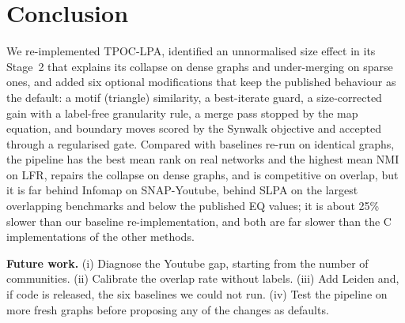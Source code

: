 \documentclass[conference]{IEEEtran}
\begin{document}
\section{Conclusion}
We re-implemented TPOC-LPA, identified an unnormalised size effect in its Stage~2 that explains its collapse on dense graphs and under-merging on sparse ones, and added six optional modifications that keep the published behaviour as the default: a motif (triangle) similarity, a best-iterate guard, a size-corrected gain with a label-free granularity rule, a merge pass stopped by the map equation, and boundary moves scored by the Synwalk objective and accepted through a regularised gate. Compared with baselines re-run on identical graphs, the pipeline has the best mean rank on real networks and the highest mean NMI on LFR, repairs the collapse on dense graphs, and is competitive on overlap, but it is far behind Infomap on SNAP-Youtube, behind SLPA on the largest overlapping benchmarks and below the published EQ values; it is about 25\% slower than our baseline re-implementation, and both are far slower than the C implementations of the other methods.

\textbf{Future work.} (i) Diagnose the Youtube gap, starting from the number of communities. (ii) Calibrate the overlap rate without labels. (iii) Add Leiden and, if code is released, the six baselines we could not run. (iv) Test the pipeline on more fresh graphs before proposing any of the changes as defaults.
\end{document}
